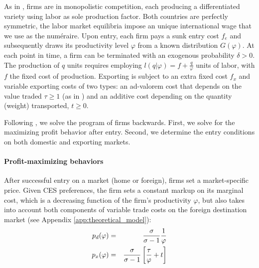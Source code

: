 \documentclass[a4paper,11pt]{article}
\begin{document}
As in \cite{melitz}, firms are in monopolistic competition, each producing a differentiated variety using labor as sole production factor. Both countries are perfectly symmetric, the labor market equilibria impose an unique international wage that we use as the num\'{e}raire. Upon entry, each firm pays a sunk entry cost $f_e$ and subsequently draws its productivity level $\varphi$ from a known distribution $G(\varphi)$.  At each point in time, a firm can be terminated
with an exogenous probability $\delta>0$.
The production of $q$ units requires employing $l(q|\varphi) = f+\frac{q}{\varphi}$ units of labor, with $f$ the fixed cost of production. Exporting is subject to an extra fixed cost $f_x$ and variable exporting costs of two types: an ad-valorem cost that depends on the value traded $\tau\geq 1$ (as in \citealp{melitz}) and an additive cost depending on the quantity (weight) transported, $t\geq 0$.

Following \cite{melitz}, we solve the program of firms backwards. First, we solve for the maximizing profit behavior after entry. Second, we determine the entry conditions on both domestic and exporting markets.\medskip
\paragraph{Profit-maximizing behaviors} After successful entry on a market (home or foreign), firms set a market-specific price. Given CES preferences, the firm sets a constant markup on its marginal cost, which is a decreasing function of the firm's productivity $\varphi$, but also takes into account both components of variable trade costs on the foreign destination market (see  Appendix \ref{app:theoretical_model}):
\begin{eqnarray}
p_d(\varphi) &=& \frac{\sigma}{\sigma-1}\frac{1}{\varphi} \notag \\
p_x(\varphi) &=& \frac{\sigma}{\sigma-1}\left[\frac{\tau}{\varphi} +t \right] \label{eq:px}
\end{eqnarray}
\end{document}
